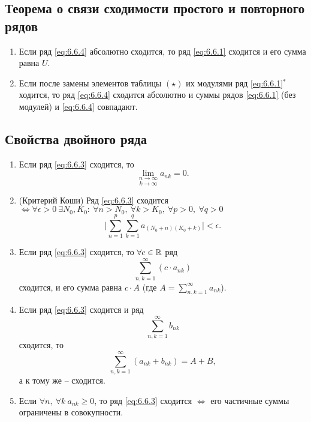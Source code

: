 \subsection{Теорема о связи сходимости простого и повторного рядов}

\begin{theorem}\leavevmode
    \begin{enumerate}
        \item Если ряд \ref{eq:6.6.4} абсолютно сходится, то ряд \ref{eq:6.6.1} сходится и его сумма равна $U$.

        \item Если после замены элементов таблицы $(\star)$ их модулями ряд \ref{eq:6.6.1}$ ^* $ ходится, то ряд \ref{eq:6.6.4} сходится абсолютно и суммы рядов \ref{eq:6.6.1} (без модулей) и \ref{eq:6.6.4} совпадают.
    \end{enumerate}
\end{theorem}

\subsection{Свойства двойного ряда}

\begin{theorem}\leavevmode
    \begin{enumerate}
        \item Если ряд \ref{eq:6.6.3} сходится, то
              \[
                  \underset{k\rightarrow\infty}{\underset{n\rightarrow\infty}{\lim}}a_{nk} = 0.
              \]

        \item (Критерий Коши)
              Ряд \ref{eq:6.6.3} сходится $\iff \forall \epsilon > 0 \ \exists N_0,K_0: \ \forall n > N_0, \ \forall k > K_0, \ \forall p > 0, \ \forall q > 0$
              \[
                  \bigg|\sum_{n=1}^{p}\sum_{k=1}^{q}a_{(N_0 + n)(K_0 + k)}\bigg| < \epsilon.
              \]

        \item Если ряд \ref{eq:6.6.3} сходится, то $\forall c \in \mathbb{R}$ ряд
              \[
                  \sum_{n,k=1}^{\infty}(c\cdot a_{nk})
              \]
              сходится, и его сумма равна $c\cdot A$ (где $A = \sum_{n,k=1}^{\infty}a_{nk}$).

        \item Если ряд \ref{eq:6.6.3} сходится и ряд
              \[
                  \sum_{n,k=1}^{\infty}b_{nk}
              \]
              сходится, то
              \[
                  \sum_{n,k=1}^{\infty}(a_{nk} + b_{nk}) = A + B,
              \]
              а к тому же -- сходится.

        \item Если $\forall n, \ \forall k \ a_{nk} \geqslant 0$, то ряд \ref{eq:6.6.3} сходится $ \iff $ его частичные суммы ограничены в совокупности.
    \end{enumerate}
\end{theorem}

